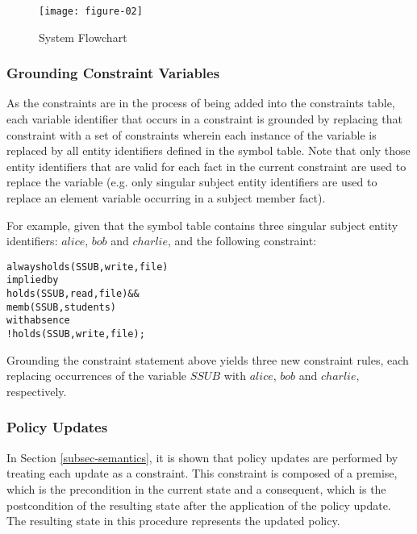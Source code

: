 \documentclass[glov2,twocolumn,final]{svjour2}
\newenvironment{vverbatim}
  {\begin{alltt}}
  {\vspace{-\baselineskip}\end{alltt}}
\begin{document}
      \begin{figure}[ht]
        \begin{center}
          \texttt{[image: figure-02]}
          \caption{System Flowchart}
          \label{fig-2}
        \end{center}
      \end{figure}

      \subsubsection{Grounding Constraint Variables}

        As the constraints are in the process of being added into the
        constraints table, each variable identifier that occurs in a
        constraint is grounded by replacing that constraint with a set of
        constraints wherein each instance of the variable is replaced by all
        entity identifiers defined in the symbol table. Note that only those
        entity identifiers that are valid for each fact in the current
        constraint are used to replace the variable (e.g. only singular
        subject entity identifiers are used to replace an element variable
        occurring in a subject member fact).

        For example, given that the symbol table contains three singular
        subject entity identifiers: $alice$, $bob$ and $charlie$, and the
        following constraint:

        \begin{vverbatim}
  always holds(SSUB, write, file)
    implied by
      holds(SSUB, read, file) &&
      memb(SSUB, students)
    with absence
      !holds(SSUB, write, file);
        \end{vverbatim}

        Grounding the constraint statement above yields three new constraint
        rules, each replacing occurrences of the variable $SSUB$ with
        $alice$, $bob$ and $charlie$, respectively.

      \subsubsection{Policy Updates}

        In Section \ref{subsec-semantics}, it is shown that policy updates are
        performed by treating each update as a constraint. This constraint is
        composed of a premise, which is the precondition in the current state
        and a consequent, which is the postcondition of the resulting state
        after the application of the policy update. The resulting state in this
        procedure represents the updated policy.
\end{document}
